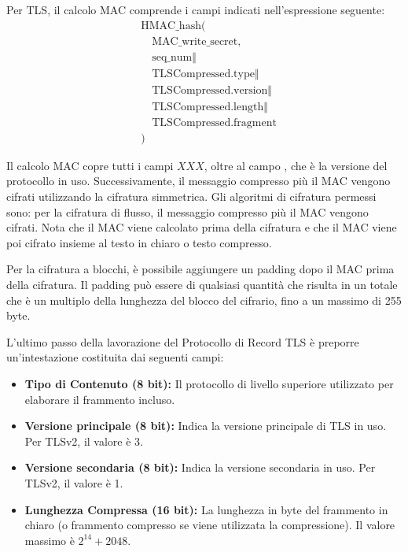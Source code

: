 \documentclass{article}
\theoremstyle{definition}
\begin{document}
Per TLS, il calcolo MAC comprende i campi indicati nell'espressione seguente:
\begin{align*}
&\text{HMAC\_hash}( \\
&\quad \text{MAC\_write\_secret}, \\
&\quad \text{seq\_num} \Vert \\
&\quad \text{TLSCompressed.type} \Vert \\
&\quad \text{TLSCompressed.version} \Vert \\
&\quad \text{TLSCompressed.length} \Vert \\
&\quad \text{TLSCompressed.fragment} \\
&)
\end{align*}

Il calcolo MAC copre tutti i campi \( XXX \), oltre al campo , che è la versione del protocollo in uso. Successivamente, il messaggio compresso più il MAC vengono cifrati utilizzando la cifratura simmetrica. Gli algoritmi di cifratura permessi sono: per la cifratura di flusso, il messaggio compresso più il MAC vengono cifrati. Nota che il MAC viene calcolato prima della cifratura e che il MAC viene poi cifrato insieme al testo in chiaro o testo compresso.

Per la cifratura a blocchi, è possibile aggiungere un padding dopo il MAC prima della cifratura. Il padding può essere di qualsiasi quantità che risulta in un totale che è un multiplo della lunghezza del blocco del cifrario, fino a un massimo di 255 byte.

L'ultimo passo della lavorazione del Protocollo di Record TLS è preporre un'intestazione costituita dai seguenti campi:

\begin{itemize}
    \item \textbf{Tipo di Contenuto (8 bit):} Il protocollo di livello superiore utilizzato per elaborare il frammento incluso.
    \item \textbf{Versione principale (8 bit):} Indica la versione principale di TLS in uso. Per TLSv2, il valore è 3.
    \item \textbf{Versione secondaria (8 bit):} Indica la versione secondaria in uso. Per TLSv2, il valore è 1.
    \item \textbf{Lunghezza Compressa (16 bit):} La lunghezza in byte del frammento in chiaro (o frammento compresso se viene utilizzata la compressione). Il valore massimo è \( 2^{14} + 2048 \).
\end{itemize}
\end{document}
